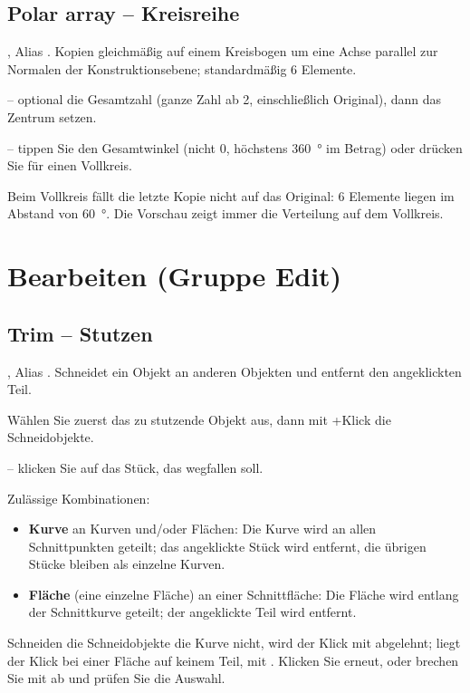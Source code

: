 \subsection{Polar array -- Kreisreihe}\label{sec:cmd-array-polar}
, Alias . Kopien gleichmäßig auf einem Kreisbogen um eine
Achse parallel zur Normalen der Konstruktionsebene; standardmäßig 6 Elemente.
\begin{schritte}
\item {} -- optional die Gesamtzahl (ganze Zahl ab 2, einschließlich
  Original), dann das Zentrum setzen.
\item {} -- tippen Sie den
  Gesamtwinkel (nicht 0, höchstens \SI{360}{\degree} im Betrag) oder drücken Sie 
  für einen Vollkreis.
\end{schritte}
Beim Vollkreis fällt die letzte Kopie nicht auf das Original: 6 Elemente liegen im Abstand von
\SI{60}{\degree}. Die Vorschau zeigt immer die Verteilung auf dem Vollkreis.

\section{Bearbeiten (Gruppe Edit)}\label{sec:gruppe-edit}

\subsection{Trim -- Stutzen}\label{sec:cmd-trim}
, Alias . Schneidet ein Objekt an anderen Objekten und entfernt den
angeklickten Teil.
\begin{schritte}
\item Wählen Sie zuerst das zu stutzende Objekt aus, dann mit +Klick die
  Schneidobjekte.
\item {} -- klicken Sie auf das
  Stück, das wegfallen soll.
\end{schritte}
Zulässige Kombinationen:
\begin{itemize}
\item \textbf{Kurve} an Kurven und/oder Flächen: Die Kurve wird an allen Schnittpunkten
  geteilt; das angeklickte Stück wird entfernt, die übrigen Stücke bleiben als einzelne Kurven.
\item \textbf{Fläche} (eine einzelne Fläche) an einer Schnittfläche: Die Fläche wird entlang der
  Schnittkurve geteilt; der angeklickte Teil wird entfernt.
\end{itemize}
Schneiden die Schneidobjekte die Kurve nicht, wird der Klick mit  abgelehnt; liegt der Klick bei einer Fläche auf keinem Teil, mit
. Klicken Sie erneut, oder brechen Sie mit  ab
und prüfen Sie die Auswahl.

